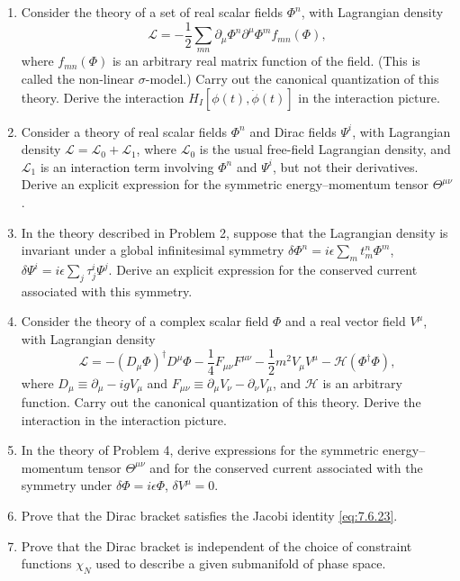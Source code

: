 

\begin{enumerate}
\item Consider the theory of a set of real scalar fields $\Phi^n$, with
Lagrangian density
\[
  \mathcal{L}=-\frac12\sum_{mn}\partial_\mu\Phi^n\partial^\mu\Phi^m
  f_{mn}(\Phi),
\]
where $f_{mn}(\Phi)$ is an arbitrary real matrix function of the field. (This
is called the non-linear $\sigma$-model.) Carry out the canonical quantization
of this theory. Derive the interaction
$H_I[\phi(t),\dot\phi(t)]$ in the interaction picture.

\item Consider a theory of real scalar fields $\Phi^n$ and Dirac fields
$\Psi^i$, with Lagrangian density $\mathcal{L}=\mathcal{L}_0+\mathcal{L}_1$,
where $\mathcal{L}_0$ is the usual free-field Lagrangian density, and
$\mathcal{L}_1$ is an interaction term involving $\Phi^n$ and $\Psi^i$,
but not their derivatives. Derive an explicit expression for the symmetric
energy--momentum tensor $\Theta^{\mu\nu}$.

\item In the theory described in Problem 2, suppose that the Lagrangian
density is invariant under a global infinitesimal symmetry
$\delta\Phi^n=i\epsilon\sum_m t^n_m\Phi^m$,
$\delta\Psi^i=i\epsilon\sum_j\tau^i_j\Psi^j$. Derive an explicit expression
for the conserved current associated with this symmetry.

\item Consider the theory of a complex scalar field $\Phi$ and a real vector
field $V^\mu$, with Lagrangian density
\[
  \mathcal{L}=-(D_\mu\Phi)^\dagger D^\mu\Phi
  -\frac14F_{\mu\nu}F^{\mu\nu}
  -\frac12m^2V_\mu V^\mu-\mathcal{H}(\Phi^\dagger\Phi),
\]
where $D_\mu\equiv\partial_\mu-igV_\mu$ and
$F_{\mu\nu}\equiv\partial_\mu V_\nu-\partial_\nu V_\mu$, and $\mathcal{H}$
is an arbitrary function. Carry out the canonical quantization of this
theory. Derive the interaction in the interaction picture.

\item In the theory of Problem 4, derive expressions for the symmetric
energy--momentum tensor $\Theta^{\mu\nu}$ and for the conserved current
associated with the symmetry under $\delta\Phi=i\epsilon\Phi$,
$\delta V^\mu=0$.

\item Prove that the Dirac bracket satisfies the Jacobi identity \eqref{eq:7.6.23}.

\item Prove that the Dirac bracket is independent of the choice of constraint
functions $\chi_N$ used to describe a given submanifold of phase space.
\end{enumerate}

